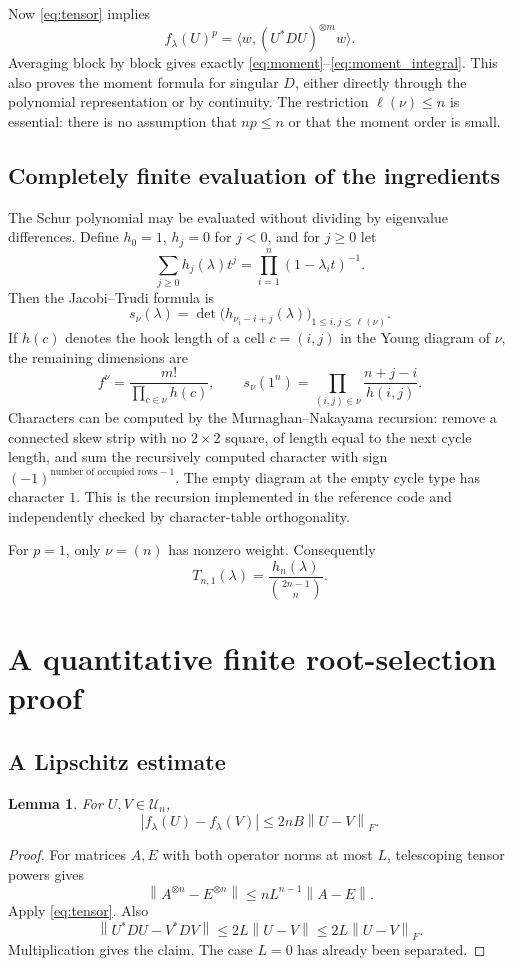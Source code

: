 \documentclass[11pt]{article}
\newcommand{\U}{\mathcal U}
\newcommand{\norm}[1]{\left\lVert#1\right\rVert}
\newcommand{\ip}[2]{\langle #1,#2\rangle}
\newtheorem{lemma}[theorem]{Lemma}
\theoremstyle{definition}\newtheorem{definition}[theorem]{Definition}
\theoremstyle{remark}\newtheorem{remark}[theorem]{Remark}
\begin{document}
Now \eqref{eq:tensor} implies
\[
 f_\lambda(U)^p=\ip{w}{(U^*DU)^{\otimes m}w}.
\]
Averaging block by block gives exactly \eqref{eq:moment}--\eqref{eq:moment_integral}. This also proves the moment formula for singular $D$, either directly through the polynomial representation or by continuity. The restriction $\ell(\nu)\leq n$ is essential: there is no assumption that $np\leq n$ or that the moment order is small.

\subsection{Completely finite evaluation of the ingredients}
The Schur polynomial may be evaluated without dividing by eigenvalue differences. Define $h_0=1$, $h_j=0$ for $j<0$, and for $j\geq0$ let
\[
 \sum_{j\geq0}h_j(\lambda)t^j=\prod_{i=1}^n(1-\lambda_i t)^{-1}.
\]
Then the Jacobi--Trudi formula is
\[
 s_\nu(\lambda)=\det\bigl(h_{\nu_i-i+j}(\lambda)\bigr)_{1\leq i,j\leq\ell(\nu)}.
\]
If $h(c)$ denotes the hook length of a cell $c=(i,j)$ in the Young diagram of $\nu$, the remaining dimensions are
\[
 f^\nu=\frac{m!}{\prod_{c\in\nu}h(c)},\qquad
 s_\nu(1^n)=\prod_{(i,j)\in\nu}\frac{n+j-i}{h(i,j)}.
\]
Characters can be computed by the Murnaghan--Nakayama recursion: remove a connected skew strip with no $2\times2$ square, of length equal to the next cycle length, and sum the recursively computed character with sign $(-1)^{\text{number of occupied rows}-1}$. The empty diagram at the empty cycle type has character $1$. This is the recursion implemented in the reference code and independently checked by character-table orthogonality.

For $p=1$, only $\nu=(n)$ has nonzero weight. Consequently
\begin{equation}\label{eq:firstmoment}
 T_{n,1}(\lambda)=\frac{h_n(\lambda)}{\binom{2n-1}{n}}.
\end{equation}

\section{A quantitative finite root-selection proof}\label{sec:selector}
\subsection{A Lipschitz estimate}
\begin{lemma}\label{lem:lipschitz}
For $U,V\in\U_n$,
\[
 |f_\lambda(U)-f_\lambda(V)|\leq2nB\norm{U-V}_F.
\]
\end{lemma}
\begin{proof}
For matrices $A,E$ with both operator norms at most $L$, telescoping tensor powers gives
\[
 \norm{A^{\otimes n}-E^{\otimes n}}
 \leq nL^{n-1}\norm{A-E}.
\]
Apply \eqref{eq:tensor}. Also
\[
 \norm{U^*DU-V^*DV}\leq2L\norm{U-V}
 \leq2L\norm{U-V}_F.
\]
Multiplication gives the claim. The case $L=0$ has already been separated.
\end{proof}
\end{document}
